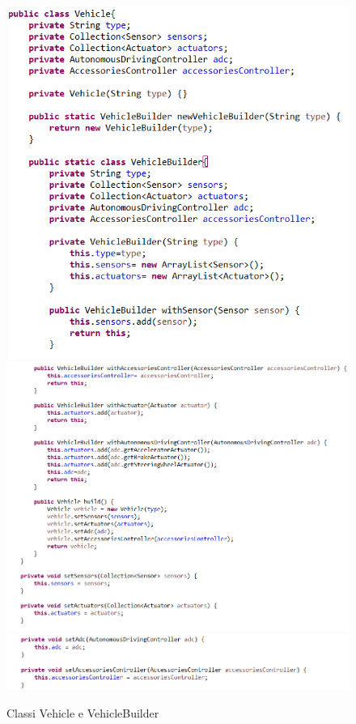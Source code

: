 \documentclass{article}
\begin{document}
\begin{itemize}
\begin{figure} [H]
\includegraphics[scale=0.6]{Vehicle1.png}
\includegraphics[scale=0.6]{Vehicle2.png}
\includegraphics[scale=0.6]{Vehicle3.png}
\caption{Classi Vehicle e VehicleBuilder}
\end{figure}



\end{itemize}
\end{document}
